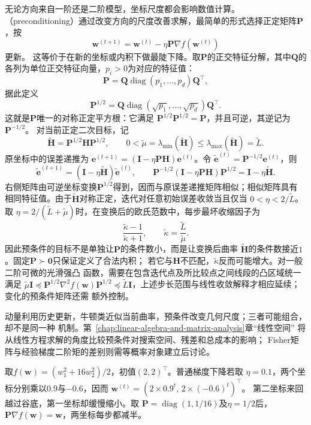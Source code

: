 无论方向来自一阶还是二阶模型，坐标尺度都会影响数值计算。
（preconditioning）通过改变方向的尺度改善求解，最简单的形式选择正定矩阵$\bm{P}$，按
\[
  \bm{w}^{(t+1)}
  =
  \bm{w}^{(t)}-\eta\bm{P}\nabla f(\bm{w}^{(t)})
\]
更新。
这等价于在新的坐标或内积下做最陡下降。取$\bm P$的正交特征分解，其中$\bm Q$的各列为单位正交特征向量，$p_i>0$为对应的特征值：
\[
  \bm{P}
  =
  \bm{Q}\operatorname{diag}(p_1,\ldots,p_d)\bm{Q}^{\top},
\]
据此定义
\[
  \bm{P}^{1/2}
  =
  \bm{Q}\operatorname{diag}(\sqrt{p_1},\ldots,\sqrt{p_d})\bm{Q}^{\top}.
\]
这就是$\bm{P}$唯一的对称正定平方根：它满足
$\bm{P}^{1/2}\bm{P}^{1/2}=\bm{P}$，并且可逆，其逆记为$\bm{P}^{-1/2}$。
对当前正定二次目标，记
\[
  \widetilde{\bm{H}}=\bm{P}^{1/2}\bm{H}\bm{P}^{1/2},
  \qquad
  0<\widetilde{\mu}
  =\lambda_{\min}(\widetilde{\bm{H}})
  \leq\lambda_{\max}(\widetilde{\bm{H}})
  =\widetilde{L}.
\]
原坐标中的误差递推为
$\bm{e}^{(t+1)}=(\bm{I}-\eta\bm{P}\bm{H})\bm{e}^{(t)}$。令
$\widetilde{\bm{e}}^{(t)}=\bm{P}^{-1/2}\bm{e}^{(t)}$，则
\[
  \widetilde{\bm{e}}^{(t+1)}
  =
  (\bm{I}-\eta\widetilde{\bm{H}})
  \widetilde{\bm{e}}^{(t)},
  \qquad
  \bm{P}^{-1/2}
  (\bm{I}-\eta\bm{P}\bm{H})
  \bm{P}^{1/2}
  =
  \bm{I}-\eta\widetilde{\bm{H}}.
\]
右侧矩阵由可逆坐标变换$\bm{P}^{1/2}$得到，因而与原误差递推矩阵相似；相似矩阵具有
相同特征值。由于$\widetilde{\bm{H}}$对称正定，迭代对任意初始误差收敛当且仅当
$0<\eta<2/\widetilde{L}$。取
$\eta=2/(\widetilde{L}+\widetilde{\mu})$时，在变换后的欧氏范数中，每步最坏收缩因子为
\[
  \frac{\widetilde{\kappa}-1}{\widetilde{\kappa}+1},
  \qquad
  \widetilde{\kappa}
  =\frac{\widetilde{L}}{\widetilde{\mu}}.
\]
因此预条件的目标不是单独让$\bm{P}$的条件数小，而是让变换后曲率
$\widetilde{\bm{H}}$的条件数接近$1$。固定$\bm{P}\succ\bm{0}$只保证定义了合法内积；
若它与$\bm{H}$不匹配，$\widetilde{\kappa}$反而可能增大。对一般二阶可微的光滑强凸
函数，需要在包含迭代点及所比较点之间线段的凸区域统一满足
$\widetilde{\mu}\bm{I}\preceq
\bm{P}^{1/2}\nabla^2f(\bm{w})\bm{P}^{1/2}
\preceq\widetilde{L}\bm{I}$，上述步长范围与线性收敛解释才相应延续；变化的预条件矩阵还需
额外控制。

动量利用历史更新，牛顿类近似当前曲率，预条件改变几何尺度；三者可能组合，却不是同一种
机制。第~\ref{chap:linear-algebra-and-matrix-analysis}章“线性空间”
将从线性方程求解的角度比较预条件对搜索空间、残差和总成本的影响；
Fisher矩阵与经验梯度二阶矩的差别则需等概率对象建立后讨论。

\begin{example}[两个曲率方向上的预条件]
\label{ex:opt-anisotropic-preconditioning}
取$f(\bm w)=(w_1^2+16w_2^2)/2$，初值$(2,2)^{\top}$。普通梯度下降若取
$\eta=0.1$，两个坐标分别乘以$0.9$与$-0.6$，因而
$\bm w^{(t)}=(2\times0.9^t,\,2\times(-0.6)^t)^{\top}$。
第二坐标来回越过谷底，第一坐标却缓慢缩小。取
$\bm P=\operatorname{diag}(1,1/16)$及$\eta=1/2$后，
$\bm P\nabla f(\bm w)=\bm w$，两坐标每步都减半。
\end{example}


